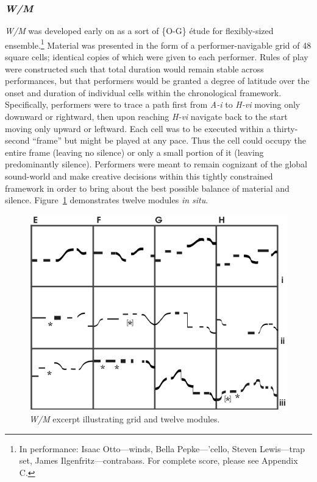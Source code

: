     \subsubsection{\textit{W/M}} 
    
    \textit{W/M} was developed early on as a sort of \{O-G\} \'{e}tude for flexibly-sized ensemble.\footnote{In performance: Isaac Otto---winds, Bella Pepke---'cello, Steven Lewis---trap set, James Ilgenfritz---contrabass. For complete score, please see Appendix C.} Material was presented in the form of a performer-navigable grid of 48 square cells; identical copies of which were given to each performer. Rules of play were constructed such that total duration would remain stable across performances, but that performers would be granted a degree of latitude over the onset and duration of individual cells within the chronological framework. Specifically, performers were to trace a path first from \textit{A-i} to \textit{H-vi} moving only downward or rightward, then upon reaching \textit{H-vi} navigate back to the start moving only upward or leftward. Each cell was to be executed within a thirty-second ``frame'' but might be played at any pace. Thus the cell could occupy the entire frame (leaving no silence) or only a small portion of it (leaving predominantly silence). Performers were meant to remain cognizant of the global sound-world and make creative decisions within this tightly constrained framework in order to bring about the best possible balance of material and silence. Figure~\ref{fig:wmselection} demonstrates twelve modules \textit{in situ}.

        \begin{figure}
            \centering
            \includegraphics[width=.6\textwidth]{images/chapter4/wmselection.png}
            \captionsetup{width=.5\textwidth}
            \caption{\textit{W/M} excerpt illustrating grid and twelve modules.}
            \label{fig:wmselection}
        \end{figure}

